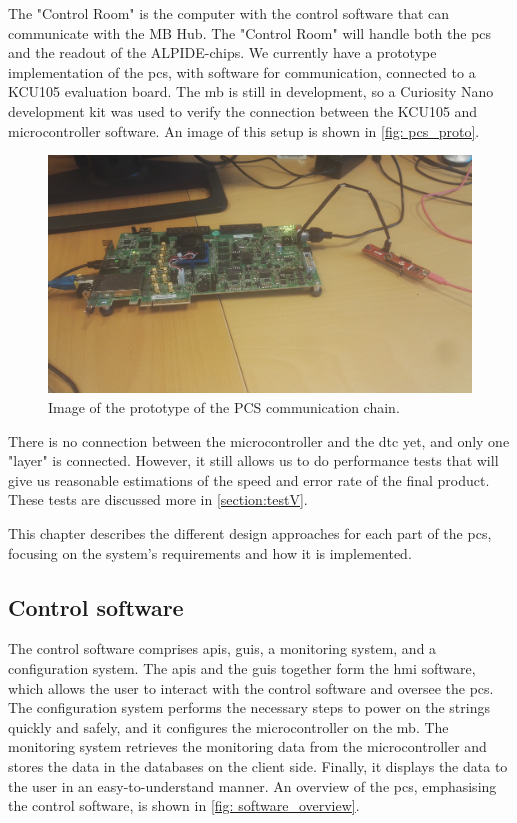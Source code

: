 \documentclass[main.tex]{subfiles}
\begin{document}
The "Control Room" is the computer with the control software that can communicate with the MB Hub. The "Control Room" will handle both the \gls{pcs} and the readout of the ALPIDE-chips. We currently have a prototype implementation of the \gls{pcs}, with software for communication, connected to a KCU105 evaluation board. The \gls{mb} is still in development, so a Curiosity Nano development kit was used to verify the connection between the KCU105 and microcontroller software. An image of this setup is shown in \autoref{fig: pcs_proto}.

\begin{figure}[!htpb]
    \centering
    \includegraphics[width=15cm]{images/pcs_setup.jpg}
    \caption{Image of the prototype of the PCS communication chain.}
    \label{fig: pcs_proto}
\end{figure}
\FloatBarrier


There is no connection between the microcontroller and the \gls{dtc} yet, and only one "layer" is connected. However, it still allows us to do performance tests that will give us reasonable estimations of the speed and error rate of the final product. These tests are discussed more in \autoref{section:testV}.

This chapter describes the different design approaches for each part of the \gls{pcs}, focusing on the system's requirements and how it is implemented.

\subsection{Control software}

The control software comprises \gls{api}s, \gls{gui}s, a monitoring system, and a configuration system. The \gls{api}s and the \gls{gui}s together form the \gls{hmi} software, which allows the user to interact with the control software and oversee the \gls{pcs}. The configuration system performs the necessary steps to power on the strings quickly and safely, and it configures the microcontroller on the \gls{mb}. The monitoring system retrieves the monitoring data from the microcontroller and stores the data in the databases on the client side. Finally, it displays the data to the user in an easy-to-understand manner. An overview of the \gls{pcs}, emphasising the control software, is shown in \autoref{fig: software_overview}.
\end{document}
